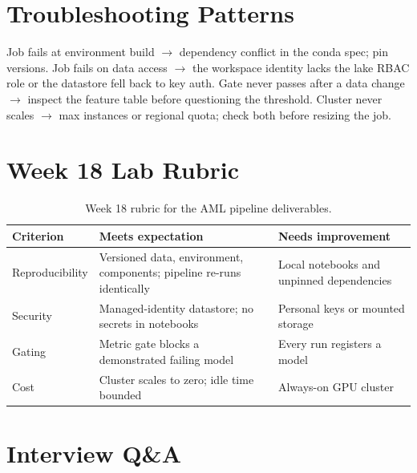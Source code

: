 \section{Troubleshooting Patterns}
Job fails at environment build $\rightarrow$ dependency conflict in the conda spec; pin versions. Job fails on data access $\rightarrow$ the workspace identity lacks the lake RBAC role or the datastore fell back to key auth. Gate never passes after a data change $\rightarrow$ inspect the feature table before questioning the threshold. Cluster never scales $\rightarrow$ max instances or regional quota; check both before resizing the job.

\section{Week 18 Lab Rubric}
\begin{table}[H]
\centering
\small
\begin{tabular}{@{}p{3.2cm}p{5.0cm}p{5.0cm}@{}}
\toprule
\textbf{Criterion} & \textbf{Meets expectation} & \textbf{Needs improvement} \\
\midrule
Reproducibility & Versioned data, environment, components; pipeline re-runs identically & Local notebooks and unpinned dependencies \\
Security & Managed-identity datastore; no secrets in notebooks & Personal keys or mounted storage \\
Gating & Metric gate blocks a demonstrated failing model & Every run registers a model \\
Cost & Cluster scales to zero; idle time bounded & Always-on GPU cluster \\
\bottomrule
\end{tabular}
\caption{Week 18 rubric for the AML pipeline deliverables.}
\label{tab:ch18-rubric}
\end{table}

\section{Interview Q\&A}
